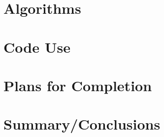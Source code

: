 \documentclass[10pt]{article}
\begin{document}
\lipsum[2] 







\section{Algorithms}

\lipsum[3] 







\section{Code Use}

\lipsum[4] 







\section{Plans for Completion}

\lipsum[5] 







\section{Summary/Conclusions}

\lipsum[6] 








\end{document}
